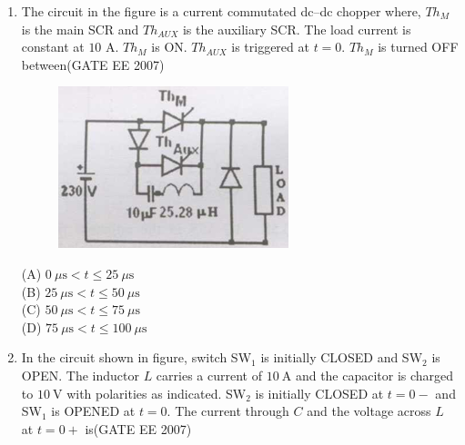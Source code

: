 \documentclass[a4paper,10pt]{exam}
\theoremstyle{remark}
\begin{document}
\begin{enumerate}
The diode conducts for\hfill{(GATE EE 2007)} 
\begin{multicols}{4}
\begin{enumerate}
\item The angle is $90^\circ$
\item $180^\circ$
\item $270^\circ$
\item $360^\circ$
\end{enumerate}
\end{multicols}

\item \quad The circuit in the figure is a current commutated dc--dc chopper where, $Th_{M}$ is the main SCR and $Th_{AUX}$  is the auxiliary SCR. The load current is constant at $10$ A. $Th_{M}$  is ON. $Th_{AUX}$  is triggered at $t=0$. $Th_{M}$  is turned OFF between\hfill{(GATE EE 2007)} 

\begin{figure}[H]
    \centering
    \includegraphics[width=0.45\linewidth]{figs/Q 60.png} \caption{}     \label{fig:myfigure}
\end{figure}


\begin{multicols}{2}
(A) $0~\mu\mathrm{s} < t \leq 25~\mu\mathrm{s}$ \\
(B) $25~\mu\mathrm{s} < t \leq 50~\mu\mathrm{s}$ \\
(C) $50~\mu\mathrm{s} < t \leq 75~\mu\mathrm{s}$ \\
(D) $75~\mu\mathrm{s} < t \leq 100~\mu\mathrm{s}$ \\
\end{multicols}

\item  \quad In the circuit shown in figure, switch SW$_1$ is initially CLOSED and SW$_2$ is OPEN. The inductor $L$ carries a current of $10~\mathrm{A}$ and the capacitor is charged to $10~\mathrm{V}$ with polarities as indicated. SW$_2$ is initially CLOSED at $t = 0-$ and SW$_1$ is OPENED at $t = 0$. The current through $C$ and the voltage across $L$ at $t = 0+$ is\hfill{(GATE EE 2007)} 


\end{enumerate}
\end{document}
